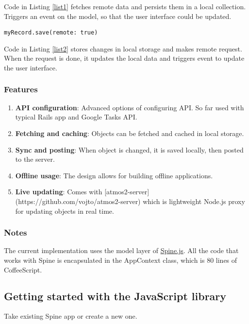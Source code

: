 Code in Listing \ref{list1} fetches remote data and persists them in a local collection. Triggers an event on the model, so that the user interface could be updated.

\begin{lstlisting}[caption=Saving object,label=list2]
myRecord.save(remote: true)
\end{lstlisting}
    
Code in Listing \ref{list2} stores changes in local storage and makes remote request. When the request is done, it updates the local data and triggers event to update the user interface.

\subsubsection{Features}

\begin{enumerate}
\item \textbf{API configuration}: Advanced options of configuring API. So far used with typical Rails app and Google Tasks API.
\item \textbf{Fetching and caching}: Objects can be fetched and cached in local storage.
\item \textbf{Sync and posting}: When object is changed, it is saved locally, then posted to the server.
\item \textbf{Offline usage}: The design allows for building offline applications.
\item \textbf{Live updating}: Comes with [atmos2-server](https://github.com/vojto/atmos2-server) which is lightweight Node.js proxy for updating objects in real time.
\end{enumerate}

\subsubsection{Notes}

The current implementation uses the model layer of \href{http://spinejs.com}{Spine.js}. All the code that works with Spine is encapsulated in the AppContext class, which is 80 lines of CoffeeScript.

\subsection{Getting started with the JavaScript library}

Take existing Spine app or create a new one.

